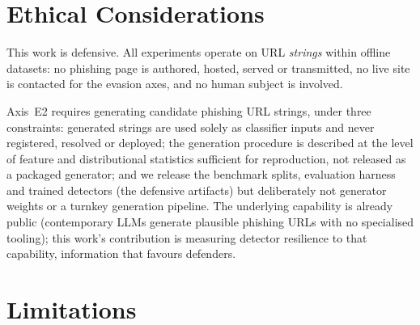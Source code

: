 \documentclass[conference]{IEEEtran}
\begin{document}
\section{Ethical Considerations}
\label{sec:ethics}

This work is defensive. All experiments operate on URL \emph{strings}
within offline datasets: no phishing page is authored, hosted, served or
transmitted, no live site is contacted for the evasion axes, and no human
subject is involved.

Axis~E2 requires generating candidate phishing URL strings, under three
constraints: generated strings are used solely as classifier inputs and
never registered, resolved or deployed; the generation procedure is
described at the level of feature and distributional statistics
sufficient for reproduction, not released as a packaged generator; and we
release the benchmark splits, evaluation harness and trained detectors (the defensive artifacts) but
deliberately not generator weights or a
turnkey generation pipeline. The underlying capability is already public
(contemporary LLMs generate plausible phishing URLs with no specialised
tooling); this work's contribution is measuring detector resilience to
that capability, information that favours defenders.

\section{Limitations}
\label{sec:limitations}
\end{document}
